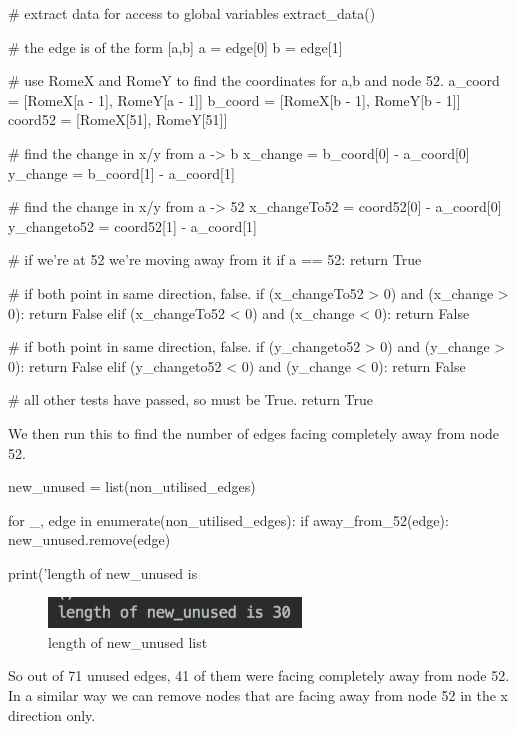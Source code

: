 \documentclass[paper=a4, fontsize=12pt]{scrartcl} %
\numberwithin{equation}{section}       %
\numberwithin{figure}{section}         %
\numberwithin{table}{section}          %
\begin{document}
\begin{enumerate}
\begin{python}
    # extract data for access to global variables
    extract_data()

    # the edge is of the form [a,b]
    a = edge[0]
    b = edge[1]

    # use RomeX and RomeY to find the coordinates for a,b and node 52.
    a_coord = [RomeX[a - 1], RomeY[a - 1]]
    b_coord = [RomeX[b - 1], RomeY[b - 1]]
    coord52 = [RomeX[51], RomeY[51]]

    # find the change in x/y from a -> b
    x_change = b_coord[0] - a_coord[0]
    y_change = b_coord[1] - a_coord[1]

    # find the change in x/y from a -> 52
    x_changeTo52 = coord52[0] - a_coord[0]
    y_changeto52 = coord52[1] - a_coord[1]

    # if we're at 52 we're moving away from it
    if a == 52:
        return True

    # if both point in same direction, false.
    if (x_changeTo52 > 0) and (x_change > 0):
        return False
    elif (x_changeTo52 < 0) and (x_change < 0):
        return False

    # if both point in same direction, false.
    if (y_changeto52 > 0) and (y_change > 0):
        return False
    elif (y_changeto52 < 0) and (y_change < 0):
        return False

    # all other tests have passed, so must be True.
    return True  
\end{python}

We then run this to find the number of edges facing completely away from node 52.

\begin{python}
new_unused = list(non_utilised_edges)

for _, edge in enumerate(non_utilised_edges):
	if away_from_52(edge):
	new_unused.remove(edge)

print('length of new_unused is %
\end{python}

\begin{figure}[h]
\caption{length of new\_unused list}
\centering
\includegraphics[width=0.6\textwidth]{new_unused}
\end{figure}

So out of 71 unused edges, 41 of them were facing completely away from node 52. In a similar way we can remove nodes that are facing away from node 52 in the x direction only. 


\end{enumerate}
\end{document}

